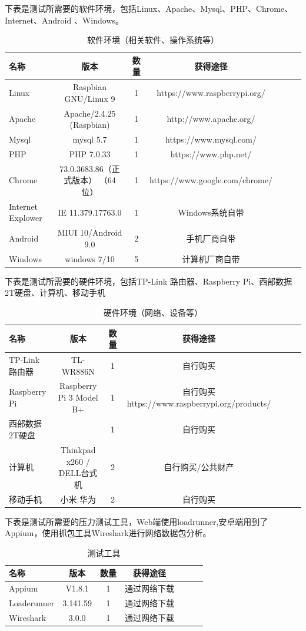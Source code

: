 下表是测试所需要的软件环境，包括Linux、Apache、Mysql、PHP、Chrome、Internet、Android 、Windows。
\begin{table}[htbp]\center
    \caption{软件环境（相关软件、操作系统等）}
    \begin{tabular}{lcccccl}
        \toprule
        名称 &  版本 & 数量 & 获得途径 \\
        \midrule
        Linux & Raspbian GNU/Linux 9 & 1 & https://www.raspberrypi.org/ \\
        Apache &  Apache/2.4.25 (Raspbian) & 1 & http://www.apache.org/ \\
        Mysql & mysql 5.7 & 1 & https://www.mysql.com/ \\
        PHP & PHP 7.0.33 & 1 & https://www.php.net/ \\
        Chrome & 73.0.3683.86（正式版本） （64 位） & 1 & https://www.google.com/chrome/ \\
        Internet Explower & IE 11.379.17763.0 & 1 & Windows系统自带 \\
        Android & MIUI 10/Android 9.0 & 2 & 手机厂商自带 \\
        Windows & windows 7/10 & 5 & 计算机厂商自带 \\
        \bottomrule 
    \end{tabular}
\end{table}
下表是测试所需要的硬件环境，包括TP-Link 路由器、Raspberry Pi、西部数据2T硬盘、计算机、移动手机\begin{table}[htbp]\center
    \caption{硬件环境（网络、设备等）}
    \begin{tabular}{lcccccl}
        \toprule
        名称 &  版本 & 数量 & 获得途径 \\
        \midrule
        TP-Link 路由器 & TL-WR886N & 1 & 自行购买 \\
        Raspberry Pi & Raspberry Pi 3 Model B+ & 1 & 自行购买 https://www.raspberrypi.org/products/ \\
        西部数据2T硬盘 & & 1 & 自行购买 \\
        计算机 & Thinkpad x260 / DELL台式机  & 2 & 自行购买/公共财产 \\
        移动手机 & 小米  华为 & 2 & 自行购买 \\
        \bottomrule 
    \end{tabular}
\end{table}
下表是测试所需要的压力测试工具，Web端使用loadrunner,安卓端用到了Appium，使用抓包工具Wireshark进行网络数据包分析。
\begin{table}[htbp]\center
    \caption{测试工具}
    \begin{tabular}{lcccccl}
        \toprule
        名称 &  版本 & 数量 & 获得途径 \\
        \midrule
        Appium & V1.8.1 & 1 & 	通过网络下载 \\
        Loaderunner & 3.141.59 & 1 & 通过网络下载 \\
        Wireshark & 3.0.0 & 1 & 通过网络下载 \\
        \bottomrule 
    \end{tabular}
\end{table}

